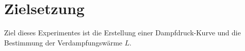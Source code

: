 \section{Zielsetzung}
\label{sec:Zielsetzung}

Ziel dieses Experimentes ist die Erstellung einer Dampfdruck-Kurve und die Bestimmung der Verdampfungswärme $L$.